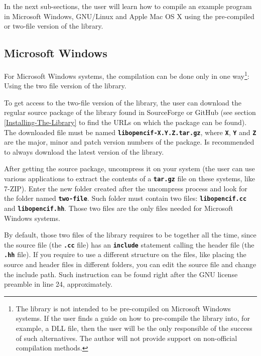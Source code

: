 \documentclass[11pt,twoside,openany,x11names,svgnames]{memoir}
\begin{document}
In the next sub-sections, the user will learn how to compile an example program in Microsoft Windows, GNU/Linux and Apple Mac OS X using the pre-compiled or two-file version of the library.

\subsection{Microsoft Windows}\label{Compiling-On-Windows}
 
For Microsoft Windows systems, the compilation can be done only in one way\footnote{The library is not intended to be pre-compiled on Microsoft Windows systems. If the user finds a guide on how to pre-compile the library into, for example, a DLL file, then the user will be the only responsible of the success of such alternatives. The author will not provide support on non-official compilation methods.}: Using the two file version of the library.

To get access to the two-file version of the library, the user can download the regular source package of the library found in SourceForge or GitHub (see section \ref{Installing-The-Library} to find the URLs on which the package can be found). The downloaded file must be named \textbf{\texttt{libopencif-X.Y.Z.tar.gz}}, where \textbf{\texttt{X}}, \textbf{\texttt{Y}} and \textbf{\texttt{Z}} are the major, minor and patch version numbers of the package. Is recommended to always download the latest version of the library.

After getting the source package, uncompress it on your system (the user can use various applications to extract the contents of a \textbf{\texttt{tar.gz}} file on these systems, like 7-ZIP). Enter the new folder created after the uncompress process and look for the folder named \textbf{\texttt{two-file}}. Such folder must contain two files: \textbf{\texttt{libopencif.cc}} and \textbf{\texttt{libopencif.hh}}. Those two files are the only files needed for Microsoft Windows systems.

By default, those two files of the library requires to be together all the time, since the source file (the \textbf{\texttt{.cc}} file) has an \textbf{\texttt{include}} statement calling the header file (the \textbf{\texttt{.hh}} file). If you require to use a different structure on the files, like placing the source and header files in different folders, you can edit the source file and change the include path. Such instruction can be found right after the GNU license preamble in line 24, approximately.
\end{document}
